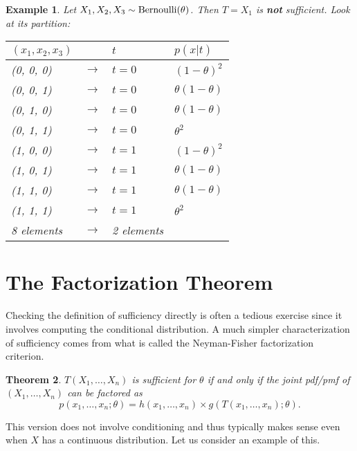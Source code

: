 \documentclass[twoside,12pt]{article}
\newcounter{lecnum}
\newtheorem{theorem}{Theorem}[lecnum]
\newtheorem{example}[theorem]{Example}
\begin{document}
\begin{example}
Let $X_1, X_2, X_3\sim {\rm Bernoulli} (\theta)$.
Then $T=X_1$ is {\bf not} sufficient.
Look at its partition:
\begin{center}
\begin{tabular}{llll}
$(x_1,x_2,x_3)$ & & $t$ & $p(x|t)$\\ \hline
(0, 0, 0) & $\rightarrow$ & $t=0$ & $(1-\theta)^2$\\
(0, 0, 1) & $\rightarrow$ & $t=0$ & $\theta (1-\theta)$\\
(0, 1, 0) & $\rightarrow$ & $t=0$ & $\theta (1-\theta)$\\
(0, 1, 1) & $\rightarrow$ & $t=0$ & $\theta^2$\\ \hline
(1, 0, 0) & $\rightarrow$ & $t=1$ & $(1-\theta)^2$\\
(1, 0, 1) & $\rightarrow$ & $t=1$ & $\theta (1-\theta)$\\
(1, 1, 0) & $\rightarrow$ & $t=1$ & $\theta (1-\theta)$\\
(1, 1, 1) & $\rightarrow$ & $t=1$ & $\theta^2$\\ \hline
8 elements & $\rightarrow$ & 2 elements
\end{tabular}
\end{center}
\end{example}


\section{The Factorization Theorem}
Checking the definition of sufficiency directly is often a tedious exercise since it involves computing the conditional distribution. A much simpler
characterization of sufficiency comes from what is called the Neyman-Fisher factorization criterion.

\begin{theorem}
$T(X_1,\ldots,X_n)$ is sufficient for
$\theta$ if and only if the joint pdf/pmf of $(X_1,\ldots,X_n)$ can be factored as 
$$
p(x_1,\ldots,x_n;\theta) =
h(x_1,\ldots,x_n)\times g(T(x_1,\ldots,x_n);\theta).
$$
\end{theorem}
This version does not involve conditioning and thus typically makes sense even when $X$ has a continuous distribution. Let us consider an example of this.

\end{document}
